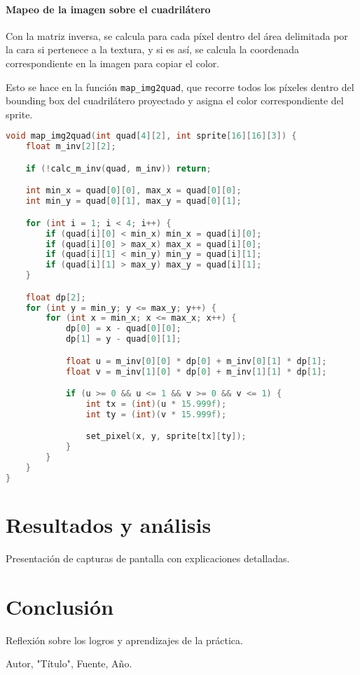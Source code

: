 \documentclass[12pt]{article}
\begin{document}
    \paragraph{Mapeo de la imagen sobre el cuadrilátero}

    Con la matriz inversa, se calcula para cada píxel dentro del área delimitada por la cara si pertenece a la textura, y si es así, se calcula la coordenada correspondiente en la imagen para copiar el color.

    Esto se hace en la función \texttt{map\_img2quad}, que recorre todos los píxeles dentro del bounding box del cuadrilátero proyectado y asigna el color correspondiente del sprite.

    \begin{lstlisting}[language=C, caption={Mapeo de la textura al cuadrilátero}]
void map_img2quad(int quad[4][2], int sprite[16][16][3]) {
    float m_inv[2][2];

    if (!calc_m_inv(quad, m_inv)) return;

    int min_x = quad[0][0], max_x = quad[0][0];
    int min_y = quad[0][1], max_y = quad[0][1];

    for (int i = 1; i < 4; i++) {
        if (quad[i][0] < min_x) min_x = quad[i][0];
        if (quad[i][0] > max_x) max_x = quad[i][0];
        if (quad[i][1] < min_y) min_y = quad[i][1];
        if (quad[i][1] > max_y) max_y = quad[i][1];
    }

    float dp[2];
    for (int y = min_y; y <= max_y; y++) {
        for (int x = min_x; x <= max_x; x++) {
            dp[0] = x - quad[0][0];
            dp[1] = y - quad[0][1];

            float u = m_inv[0][0] * dp[0] + m_inv[0][1] * dp[1];
            float v = m_inv[1][0] * dp[0] + m_inv[1][1] * dp[1];

            if (u >= 0 && u <= 1 && v >= 0 && v <= 1) {
                int tx = (int)(u * 15.999f);
                int ty = (int)(v * 15.999f);

                set_pixel(x, y, sprite[tx][ty]);
            }
        }
    }
}
    \end{lstlisting}

    \section{Resultados y análisis}
    Presentación de capturas de pantalla con explicaciones detalladas.

    \section{Conclusión}
    Reflexión sobre los logros y aprendizajes de la práctica.

    \begin{thebibliography}{9}
         Autor, "Título", Fuente, Año.
    \end{thebibliography}
\end{document}
